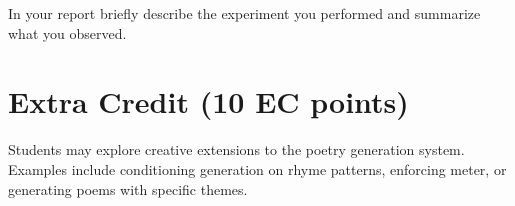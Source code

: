 In your report briefly describe the experiment you performed and summarize
what you observed.

\section{Extra Credit (10 EC points)}

Students may explore creative extensions to the poetry generation system.
Examples include conditioning generation on rhyme patterns, enforcing meter,
or generating poems with specific themes.

